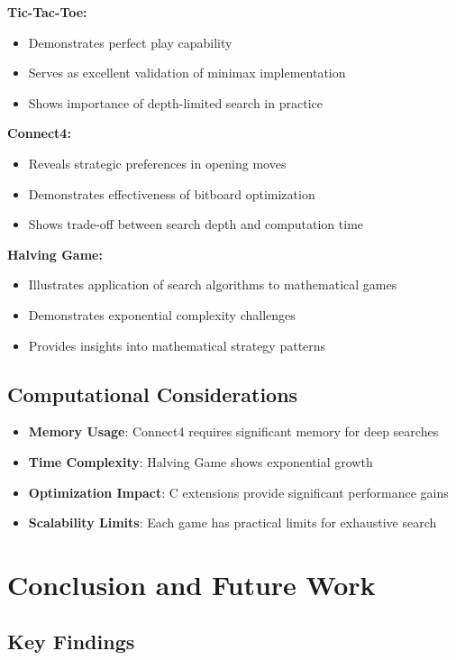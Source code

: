 \documentclass[12pt]{article}
\begin{document}
\textbf{Tic-Tac-Toe:}
\begin{itemize}
    \item Demonstrates perfect play capability
    \item Serves as excellent validation of minimax implementation
    \item Shows importance of depth-limited search in practice
\end{itemize}

\textbf{Connect4:}
\begin{itemize}
    \item Reveals strategic preferences in opening moves
    \item Demonstrates effectiveness of bitboard optimization
    \item Shows trade-off between search depth and computation time
\end{itemize}

\textbf{Halving Game:}
\begin{itemize}
    \item Illustrates application of search algorithms to mathematical games
    \item Demonstrates exponential complexity challenges
    \item Provides insights into mathematical strategy patterns
\end{itemize}

\subsection{Computational Considerations}

\begin{itemize}
    \item \textbf{Memory Usage}: Connect4 requires significant memory for deep searches
    \item \textbf{Time Complexity}: Halving Game shows exponential growth
    \item \textbf{Optimization Impact}: C extensions provide significant performance gains
    \item \textbf{Scalability Limits}: Each game has practical limits for exhaustive search
\end{itemize}

\section{Conclusion and Future Work}

\subsection{Key Findings}
\end{document}
